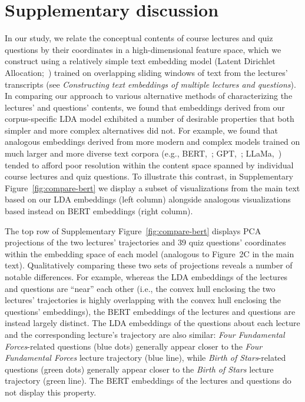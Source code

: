 \documentclass[10pt]{article}
\newcommand{\slidingWindows}{2}
\newcommand{\topicModelMethods}{\textit{Constructing text embeddings of multiple lectures and questions}}
\begin{document}
\FloatBarrier

\section*{Supplementary discussion}

\doublespacing

In our study, we relate the conceptual contents of course lectures and quiz 
questions by their coordinates in a high-dimensional feature space, which we 
construct using a relatively simple text embedding model (Latent Dirichlet 
Allocation;~\citealp{BleiEtal03}) trained on overlapping sliding windows of 
text from the lectures' transcripts (see \topicModelMethods). In comparing our 
approach to various alternative methods of characterizing the lectures' and 
questions' contents, we found that embeddings derived from our corpus-specific 
LDA model exhibited a number of desirable properties that both simpler and more 
complex alternatives did not. For example, we found that analogous embeddings 
derived from more modern and complex models trained on much larger and more 
diverse text corpora (e.g., BERT,~\citealp{DevlEtal18}; 
GPT,~\citealp{ViswEtal17}; LLaMa,~\citealp{TouvEtal23}) tended to afford poor 
resolution within the content space spanned by individual course lectures and 
quiz questions. To illustrate this contrast, in Supplementary 
Figure~\ref{fig:compare-bert} we display a subset of visualizations from the 
main text based on our LDA embeddings (left column) alongside analogous 
visualizations based instead on BERT embeddings (right column).

The top row of Supplementary Figure~\ref{fig:compare-bert} displays PCA 
projections of the two lectures' trajectories and 39 quiz questions' 
coordinates within the embedding space of each model (analogous to 
Figure~{\slidingWindows}C in the main text). Qualitatively comparing these two
sets of projections reveals a number of notable differences. For example, 
whereas the LDA embeddings of the lectures and questions are ``near'' each 
other (i.e., the convex hull enclosing the two lectures' trajectories is highly 
overlapping with the convex hull enclosing the questions' embeddings), the BERT 
embeddings of the lectures and questions are instead largely distinct. The LDA 
embeddings of the questions about each lecture and the corresponding lecture's 
trajectory are also similar: \textit{Four Fundamental Forces}-related questions 
(blue dots) generally appear closer to the \textit{Four Fundamental Forces} 
lecture trajectory (blue line), while \textit{Birth of Stars}-related questions 
(green dots) generally appear closer to the \textit{Birth of Stars} lecture 
trajectory (green line). The BERT embeddings of the lectures and questions do 
not display this property.
\end{document}
